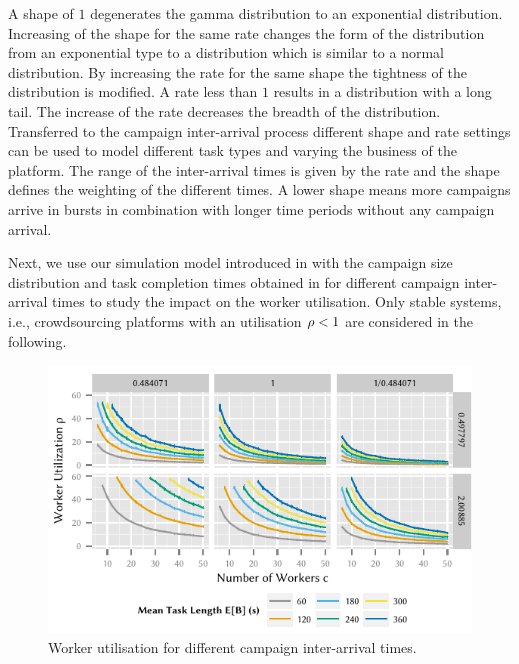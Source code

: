 A shape of \(1\) degenerates the gamma distribution to an exponential distribution.
Increasing of the shape for the same rate changes the form of the distribution from an exponential type to a distribution which is similar to a normal distribution.
By increasing the rate for the same shape the tightness of the distribution is modified.
A rate less than \(1\) results in a distribution with a long tail.
The increase of the rate decreases the breadth of the distribution.
Transferred to the campaign inter-arrival process different shape and rate settings can be used to model different task types and varying the business of the platform.
The range of the inter-arrival times is given by the rate and the shape defines the weighting of the different times.
A lower shape means more campaigns arrive in bursts in combination with longer time periods without any campaign arrival.

Next, we use our simulation model introduced in  with the campaign size distribution and task completion times obtained in  for different campaign inter-arrival times to study the impact on the worker utilisation. 
Only stable systems, i.e., crowdsourcing platforms with an utilisation \(\rho < 1\) are considered in the following.

\begin{figure}
	\centering
	\includegraphics{cloud/crowdsourcing/numerical_evaluation/figures/parameter_utilization}
	\caption{Worker utilisation for different campaign inter-arrival times.}
	\label{fig:cloud:crowdsourcing:performance_evaluation:distributions:parameter_utilization}
\end{figure}


